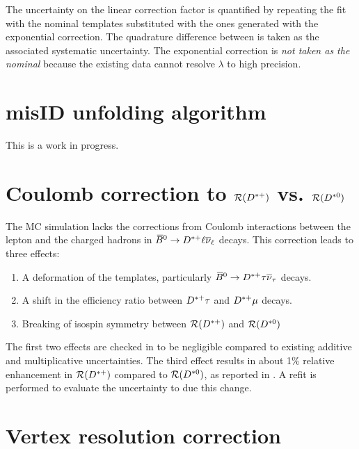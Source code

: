 The uncertainty on the linear correction factor is quantified by
repeating the fit with the nominal \BComb templates substituted with
the ones generated with the exponential correction.
The quadrature difference between \RDX is taken as the associated systematic
uncertainty.
The exponential correction is \emph{not taken as the nominal} because the
existing data cannot resolve $\lambda$ to high precision.


\section{\muon misID unfolding algorithm}
\label{sys-algo-misid}

This is a work in progress.


\section{Coulomb correction to $\mathcal{R}({{D}^{*+}})$ vs. $\mathcal{R}({{D}^{*0}})$}
\label{sys-theory-coulomb}

The MC simulation lacks the corrections from Coulomb interactions between
the lepton and the charged hadrons in
${{\kern 0.18em\overline{\kern -0.18em B}}{}^0} \rightarrow {\ensuremath{{D}^{*+}}}\ell{\ensuremath{{\overline{\nu}}_\ell}}$ decays.
This correction leads to three effects:

\begin{enumerate}
    \item A deformation of the templates, particularly
        ${{\kern 0.18em\overline{\kern -0.18em B}}{}^0} \rightarrow {\ensuremath{{D}^{*+}}}{\ensuremath{\tau}}{\ensuremath{{\overline{\nu}}_\tau}}$ decays.
    \item A shift in the efficiency ratio between ${{D}^{*+}}\tau$ and ${{D}^{*+}}\mu$
        decays.
    \item Breaking of isospin symmetry between
        $\mathcal{R}({{D}^{*+}})$ and $\mathcal{R}({{D}^{*0}})$
\end{enumerate}

The first two effects are checked in \cite{LHCb-ANA-2020-056} to be negligible
compared to existing additive and multiplicative uncertainties.
The third effect results in about 1\% relative enhancement in $\mathcal{R}
({{D}^{*+}})$ compared to $\mathcal{R}({{D}^{*0}})$,
as reported in \cite{Cal__2019}.
A refit is performed to evaluate the uncertainty to due this change.


\section{Vertex resolution correction}
\label{sys-cor-vtx}

